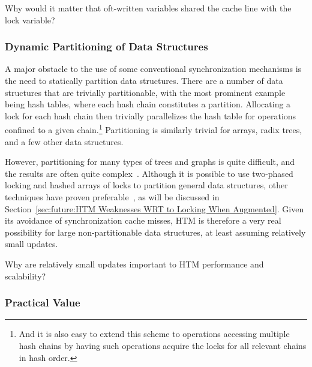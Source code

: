 \QuickQuiz{}
	Why would it matter that oft-written variables shared the cache
	line with the lock variable?
 \QuickQuizEnd

\subsubsection{Dynamic Partitioning of Data Structures}
\label{sec:future:Dynamic Partitioning of Data Structures}

A major obstacle to the use of some conventional synchronization mechanisms
is the need to statically partition data structures.
There are a number of data structures that are trivially
partitionable, with the most prominent example being hash tables,
where each hash chain constitutes a partition.
Allocating a lock for each hash chain then trivially parallelizes
the hash table for operations confined to a given chain.\footnote{
	And it is also easy to extend this scheme to operations accessing
	multiple hash chains by having such operations acquire the
	locks for all relevant chains in hash order.}
Partitioning is similarly trivial for arrays, radix trees, and a few
other data structures.

However, partitioning for many types of trees and graphs is quite
difficult, and the results are often quite complex~\cite{Ellis80}.
Although it is possible to use two-phased locking and hashed arrays
of locks to partition general data structures, other techniques
have proven preferable~\cite{DavidSMiller2006HashedLocking},
as will be discussed in
Section~\ref{sec:future:HTM Weaknesses WRT to Locking When Augmented}.
Given its avoidance of synchronization cache misses,
HTM is therefore a very real possibility for large non-partitionable
data structures, at least assuming relatively small updates.

\QuickQuiz{}
	Why are relatively small updates important to HTM performance
	and scalability?
 \QuickQuizEnd

\subsubsection{Practical Value}
\label{sec:future:Practical Value}

